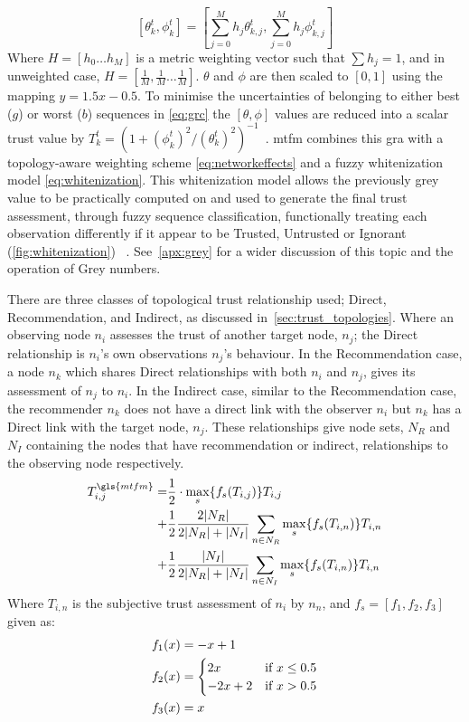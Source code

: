 %
\begin{equation}
  \label{eq:metric_weighting}
  [\theta_k^t, \phi_k^t] = \left[\sum_{j=0}^M h_j \theta_{k,j}^t,\sum_{j=0}^M h_j \phi_{k,j}^t \right]
\end{equation}
%
Where $H=[h_0\dots h_M]$ is a metric weighting vector such that $\sum h_j = 1$, and in unweighted case, $H=[\frac{1}{M},\frac{1}{M}\dots\frac{1}{M}]$.
$\theta$ and $\phi$ are then scaled to $[0,1]$ using the mapping $y = 1.5 x - 0.5$.
To minimise the uncertainties of belonging to either best ($g$) or worst ($b$) sequences in \eqref{eq:grc} the $[\theta,\phi]$ values are reduced into a scalar trust value by $T_k^t = ({1+{(\phi_k^t)^2}/{(\theta_k^t)^2}})^{-1}$~\cite{Hong2010}.
\gls{mtfm} combines this \gls{gra} with a topology-aware weighting scheme \eqref{eq:networkeffects} and a fuzzy whitenization model \eqref{eq:whitenization}.
This whitenization model allows the previously grey value to be practically computed on and used to generate the final trust assessment, through fuzzy sequence classification, functionally treating each observation differently if it appear to be Trusted, Untrusted or Ignorant (\autoref{fig:whitenization}) ~\cite{Liu2011}.
See~\autoref{apx:grey} for a wider discussion of this topic and the operation of Grey numbers.

There are three classes of topological trust relationship used; Direct, Recommendation, and Indirect, as discussed in~\autoref{sec:trust_topologies}.
Where an observing node $n_i$ assesses the trust of another target node, $n_j$; the Direct relationship is $n_i$'s own observations $n_j$'s behaviour.
In the Recommendation case, a node $n_k$ which shares Direct relationships with both $n_i$ and $n_j$, gives its assessment of $n_j$ to $n_i$.
In the Indirect case, similar to the Recommendation case, the recommender $n_k$ does not have a direct link with the observer $n_i$ but $n_k$ has a Direct link with the target node, $n_j$.
These relationships give node sets, $N_R$ and $N_I$ containing the nodes that have recommendation or indirect, relationships to the observing node respectively.
%
\begin{align}
  \label{eq:networkeffects}
  T_{i,j}^{\gls{mtfm}}=&\frac{1}{2} \cdot \max_s\{f_s(T_{i,j})\} T_{i,j}\\ \notag
  +&\frac{1}{2} \frac{2|N_R| }{2|N_R| + |N_I|}\sum_{n \in N_R} \max_s\{f_s(T_{i,n})\} T_{i,n}\\ \notag
  +&\frac{1}{2} \frac{|N_I| }{2|N_R| + |N_I|}\sum_{n \in N_I} \max_s\{f_s(T_{i,n})\} T_{i,n} 
\end{align}
Where $T_{i,n}$ is the subjective trust assessment of $n_i$ by $n_n$, and $f_s = [ f_1,f_2, f_3]$ given as:
\begin{align}
  \label{eq:whitenization}
  f_1(x)&= -x+1\notag\\
  f_2(x)&= 
  \begin{cases}
    2x & \text{if }x\leq 0.5\\
    -2x+2 & \text{if }x>0.5
  \end{cases}\\
  f_3(x)&= x\notag
\end{align}
%

